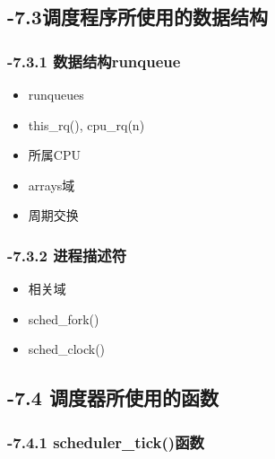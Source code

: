 \documentclass[11pt]{article}
\begin{document}
\subsection{-7.3调度程序所使用的数据结构}
\label{sec-2.3}


\subsubsection{-7.3.1 数据结构runqueue}
\label{sec-2.3.1}

\begin{itemize}
\item runqueues
\item this\_rq(), cpu\_rq(n)
\item 所属CPU
\item arrays域
\item 周期交换
\end{itemize}
\subsubsection{-7.3.2 进程描述符}
\label{sec-2.3.2}

\begin{itemize}
\item 相关域
\item sched\_fork()
\item sched\_clock()
\end{itemize}
\subsection{-7.4 调度器所使用的函数}
\label{sec-2.4}


\subsubsection{-7.4.1 scheduler\_tick()函数}
\label{sec-2.4.1}
\end{document}
